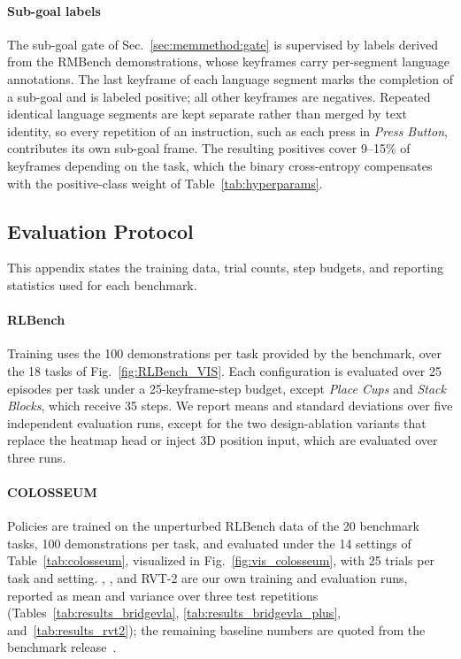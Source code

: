 \paragraph{Sub-goal labels}
\label{app:gate_labels}
The sub-goal gate of Sec.~\ref{sec:memmethod:gate} is supervised by
labels derived from the RMBench demonstrations, whose keyframes carry
per-segment language annotations.
The last keyframe of each language segment marks the completion of a
sub-goal and is labeled positive; all other keyframes are negatives.
Repeated identical language segments are kept separate rather than
merged by text identity, so every repetition of an instruction, such
as each press in \emph{Press Button}, contributes its own sub-goal
frame.
The resulting positives cover 9--15\% of keyframes depending on the
task, which the binary cross-entropy compensates with the
positive-class weight of Table~\ref{tab:hyperparams}.

\subsection{Evaluation Protocol}
\label{app:eval_protocol}

This appendix states the training data, trial counts, step budgets,
and reporting statistics used for each benchmark.

\paragraph{RLBench}
Training uses the 100 demonstrations per task provided by the
benchmark, over the 18 tasks of Fig.~\ref{fig:RLBench_VIS}.
Each configuration is evaluated over 25 episodes per task under a
25-keyframe-step budget, except \emph{Place Cups} and \emph{Stack
Blocks}, which receive 35 steps.
We report means and standard deviations over five independent
evaluation runs, except for the two design-ablation variants that
replace the heatmap head or inject 3D position input, which are
evaluated over three runs.

\paragraph{COLOSSEUM}
Policies are trained on the unperturbed RLBench data of the 20
benchmark tasks, 100 demonstrations per task, and evaluated under the
14 settings of Table~\ref{tab:colosseum}, visualized in
Fig.~\ref{fig:vis_colosseum}, with 25 trials per task and setting.
\method, \memmethod, and RVT-2 are our own training and evaluation
runs, reported as mean and variance over three test repetitions
(Tables~\ref{tab:results_bridgevla},
\ref{tab:results_bridgevla_plus},
and~\ref{tab:results_rvt2}); the remaining baseline numbers are quoted
from the benchmark release~\cite{pumacay2024colosseum}.

